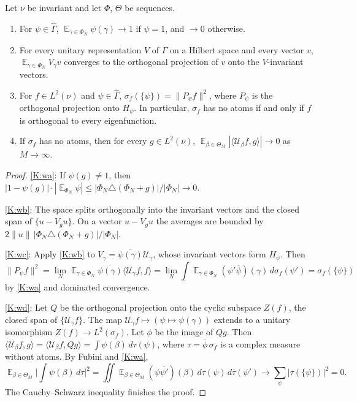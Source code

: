 \begin{lemma}\label{K:lem:wiener}
Let $\nu$ be invariant and let $\Phi$, $\Theta$ be \Fol{} sequences.
\begin{enumerate}[label=(\alph*)]
\item\label{K:wa} For $\psi\in\widehat\Gamma$, $\mathop{\mathbb E}_{\gamma\in\Phi_N}\psi(\gamma)\to1$ if
$\psi=1$, and $\to0$ otherwise.
\item\label{K:wb} For every unitary representation $V$ of $\Gamma$ on a Hilbert space and every
vector $v$, $\mathop{\mathbb E}_{\gamma\in\Phi_N}V_\gamma v$ converges to the orthogonal
projection of $v$ onto the $V$-invariant vectors.
\item\label{K:wc} For $f\in L^2(\nu)$ and $\psi\in\widehat\Gamma$, $\sigma_f(\{\psi\})=\|P_\psi f\|^2$,
where $P_\psi$ is the orthogonal projection onto $H_\psi$. In particular, $\sigma_f$ has no
atoms if and only if $f$ is orthogonal to every eigenfunction.
\item\label{K:wd} If $\sigma_f$ has no atoms, then for every $g\in L^2(\nu)$,
$\mathop{\mathbb E}_{\beta\in\Theta_M}|\langle\mathcal U_\beta f,g\rangle|\to0$ as $M\to\infty$.
\end{enumerate}
\end{lemma}

\begin{proof}
\ref{K:wa}: If $\psi(g)\ne1$, then
$|1-\psi(g)|\cdot|\mathop{\mathbb E}_{\Phi_N}\psi|\le|\Phi_N\triangle(\Phi_N+g)|/|\Phi_N|\to0$.

\ref{K:wb}: The space splits orthogonally into the invariant vectors and the closed span of
$\{u-V_gu\}$. On a vector $u-V_gu$ the averages are bounded by
$2\|u\|\,|\Phi_N\triangle(\Phi_N+g)|/|\Phi_N|$.

\ref{K:wc}: Apply \ref{K:wb} to $V_\gamma=\overline{\psi(\gamma)}\mathcal U_\gamma$, whose invariant
vectors form $H_\psi$. Then
\[
\|P_\psi f\|^2=\lim_N\mathop{\mathbb E}_{\gamma\in\Phi_N}\overline{\psi(\gamma)}\langle\mathcal U_\gamma f,f\rangle
=\lim_N\int\mathop{\mathbb E}_{\gamma\in\Phi_N}(\psi'\overline\psi)(\gamma)\,d\sigma_f(\psi')
=\sigma_f(\{\psi\})
\]
by \ref{K:wa} and dominated convergence.

\ref{K:wd}: Let $Q$ be the orthogonal projection onto the cyclic subspace $Z(f)$, the closed
span of $\{\mathcal U_\gamma f\}$.
The map $\mathcal U_\gamma f\mapsto(\psi\mapsto\psi(\gamma))$ extends to a unitary isomorphism
$Z(f)\to L^2(\sigma_f)$. Let $\phi$ be the image of $Qg$.
Then $\langle\mathcal U_\beta f,g\rangle=\langle\mathcal U_\beta f,Qg\rangle=\int\psi(\beta)\,d\tau(\psi)$, where
$\tau=\overline\phi\,\sigma_f$ is a complex measure without atoms.
By Fubini and \ref{K:wa},
\[
\mathop{\mathbb E}_{\beta\in\Theta_M}\Big|\int\psi(\beta)\,d\tau\Big|^2
=\iint\mathop{\mathbb E}_{\beta\in\Theta_M}(\psi\overline{\psi'})(\beta)\,d\tau(\psi)\,d\overline\tau(\psi')
\longrightarrow\sum_{\psi}|\tau(\{\psi\})|^2=0 .
\]
The Cauchy--Schwarz inequality finishes the proof.
\end{proof}

